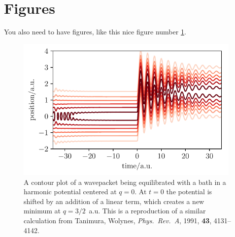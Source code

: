\documentclass[11pt]{article}
\begin{document}
\section{Figures}
You also need to have figures, like this nice figure number \ref{fig:qheom_contour}.
\begin{figure} [htp!]
	\centering
	\includegraphics [width=11cm]{qheom_contour.pdf}
	\caption{
		A contour plot of a wavepacket being equilibrated with a bath in a harmonic potential centered at $q=0$. At $t=0$ the potential is shifted by an addition of a linear term, which creates a new minimum at $q=3/2$~a.u. This is a reproduction of a similar calculation from Tanimura, Wolynes, \emph{Phys.~Rev.~A}, 1991, \textbf{43}, 4131–4142.
	}
	\label{fig:qheom_contour}
\end{figure}
\end{document}
